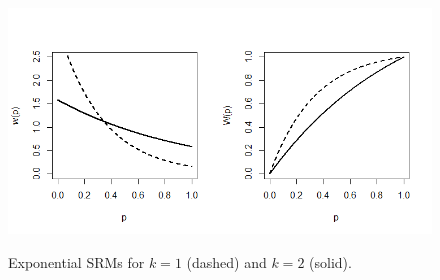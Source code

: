 \documentclass[11pt,a4paper,english]{article}
\begin{document}
\begin{figure}
	\begin{center}
		\includegraphics[scale = 0.7]{Figures/Fig1-1.png}\\
	\end{center}
	\caption{Exponential SRMs for $k=1$ (dashed) and $k=2$ (solid).}\label{Fig1:EPSRM}
\end{figure}
\end{document}
